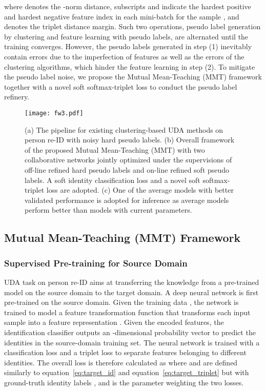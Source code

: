 \documentclass{article} \usepackage{iclr2020_conference,times}
\def\eqref#1{equation~\ref{#1}}
\begin{document}
\noindent where  denotes the -norm distance,
subscripts  and  indicate the hardest positive and hardest negative feature index in each mini-batch for the sample , and  denotes the triplet distance margin.
Such two operations, pseudo label generation by clustering and feature learning with pseudo labels, are alternated until the training converges.
However, the pseudo labels generated in step (1) inevitably contain errors due to the imperfection of features as well as the errors of the clustering algorithms, which hinder the feature learning in step (2). To mitigate the pseudo label noise, we propose the Mutual Mean-Teaching (MMT) framework together with a novel soft softmax-triplet loss to conduct the pseudo label refinery.


\begin{figure}[tb]
\begin{center}
	\texttt{[image: fw3.pdf]}
\end{center}
\vspace{-10pt}
\caption{
(a) The pipeline for existing clustering-based UDA methods on person re-ID with noisy hard pseudo labels.
(b) Overall framework of the proposed Mutual Mean-Teaching (MMT) with
two collaborative networks jointly optimized under the supervisions of off-line refined hard pseudo labels and on-line refined soft pseudo labels. A soft identity classification loss and a novel soft softmax-triplet loss are adopted. 
(c) One of the average models with better validated performance is adopted for inference as average models perform better than models with current parameters.}
\label{fig:fw}
\end{figure}


\subsection{Mutual Mean-Teaching (MMT) Framework}
\vspace{-5pt}

\subsubsection{Supervised Pre-training for Source Domain}
\vspace{-5pt}
UDA task on person re-ID aims at transferring the knowledge from a pre-trained model on the source domain to the target domain.
A deep neural network is first pre-trained on the source domain. Given the training data , the network is trained to model a feature transformation function  that transforms each input sample  into a feature representation .
Given the encoded features, the identification classifier  outputs an -dimensional probability vector to predict the identities in the source-domain training set.
The neural network is trained with a classification loss  and a triplet loss  to separate features belonging to different identities. 
The overall loss is therefore calculated as 
{\small
}where  and  are defined similarly to \eqref{eq:target_id} and \eqref{eq:target_triplet} but with ground-truth identity labels , and  is the parameter weighting the two losses.
\end{document}
